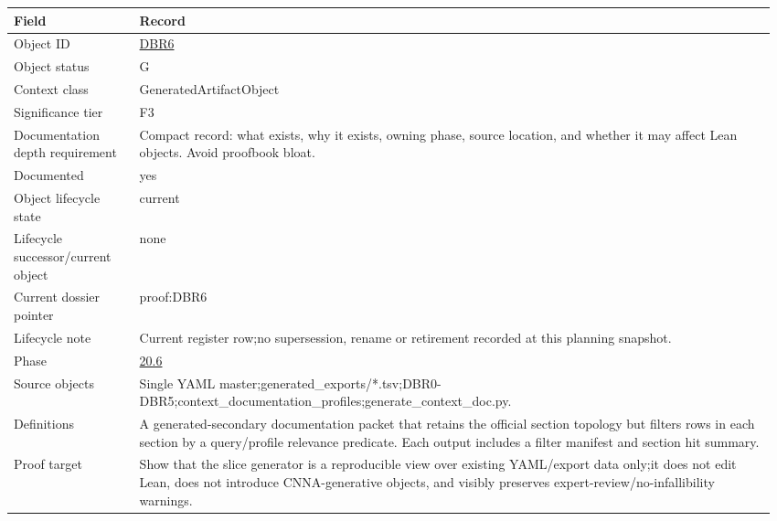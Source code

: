 \begin{longtable}{L{0.16\linewidth} L{0.81\linewidth}}
\hline
\textbf{Field} & \textbf{Record}\\
\hline
Object ID & \hyperlink{object-row-DBR6}{DBR6}\\
\hline\addlinespace[0.20em]
Object status & G\\
\hline\addlinespace[0.20em]
Context class & GeneratedArtifactObject\\
\hline\addlinespace[0.20em]
Significance tier & F3\\
\hline\addlinespace[0.20em]
Documentation depth requirement & Compact record: what exists, why it exists, owning phase, source location, and whether it may affect Lean objects. Avoid proofbook bloat.\\
\hline\addlinespace[0.20em]
Documented & yes\\
\hline\addlinespace[0.20em]
Object lifecycle state & current\\
\hline\addlinespace[0.20em]
Lifecycle successor/\allowbreak{}current object & none\\
\hline\addlinespace[0.20em]
Current dossier pointer & proof:DBR6\\
\hline\addlinespace[0.20em]
Lifecycle note & Current register row;\newline no supersession, rename or retirement recorded at this planning snapshot.\\
\hline\addlinespace[0.20em]
Phase & \hyperlink{phase-row-20-6}{20.6}\\
\hline\addlinespace[0.20em]
Source objects & Single YAML master;\newline generated\_exports/\allowbreak{}*.tsv;\newline DBR0-DBR5;\newline context\_documentation\_profiles;\newline generate\_context\_doc.py.\\
\hline\addlinespace[0.20em]
Definitions & A generated-secondary documentation packet that retains the official section topology but filters rows in each section by a query/\allowbreak{}profile relevance predicate. Each output includes a filter manifest and section hit summary.\\
\hline\addlinespace[0.20em]
Proof target & Show that the slice generator is a reproducible view over existing YAML/\allowbreak{}export data only;\newline it does not edit Lean, does not introduce CNNA-generative objects, and visibly preserves expert-review/\allowbreak{}no-infallibility warnings.\\

\end{longtable}
